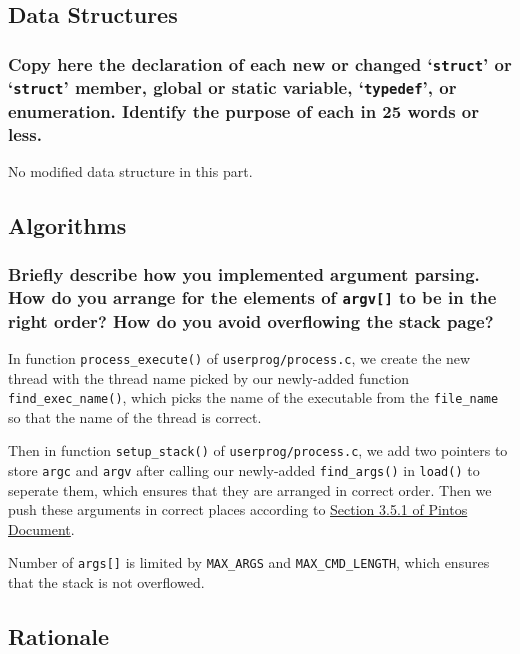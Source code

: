 \documentclass[sigconf, nonacm, balance=false, urlbreakonhyphens=true]{acmart}
\begin{document}
        \label{Argument Passing}
    
        \subsection{Data Structures}
        
            \subsubsection{Copy here the declaration of each new or changed `\texttt{struct}' or `\texttt{struct}' member, global or static variable, `\texttt{typedef}', or enumeration. Identify the purpose of each in 25 words or less. }
            
            No modified data structure in this part. 
        
        \subsection{Algorithms}
        
            \subsubsection{Briefly describe how you implemented argument parsing.  How do you arrange for the elements of \texttt{argv[]} to be in the right order?  How do you avoid overflowing the stack page? }

            In function \texttt{process\_execute()} of \texttt{userprog/process.c}, we create the new thread with the thread name picked by our newly-added function \texttt{find\_exec\_name()}, which picks the name of the executable from the \texttt{file\_name} so that the name of the thread is correct. 

            Then in function \texttt{setup\_stack()} of \texttt{userprog/process.c}, we add two pointers to store \texttt{argc} and \texttt{argv} after calling our newly-added \texttt{find\_args()} in \texttt{load()} to seperate them, which ensures that they are arranged in correct order. Then we push these arguments in correct places according to \href{http://web.stanford.edu/~ouster/cgi-bin/cs140-spring20/pintos/pintos_3.html#SEC51}{Section 3.5.1 of Pintos Document}. 

            Number of \texttt{args[]} is limited by \texttt{MAX\_ARGS} and \texttt{MAX\_CMD\_LENGTH}, which ensures that the stack is not overflowed. 
        
        \subsection{Rationale}
            
\end{document}
